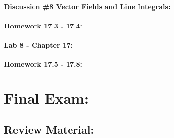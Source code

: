 \documentclass[9pt]{amsart}
\begin{document}
        \paragraph{Discussion \#8 Vector Fields and Line Integrals:}
            

        \paragraph{Homework 17.3 - 17.4:}
            
        \newpage
        \paragraph{Lab 8 - Chapter 17:}
            

        \paragraph{Homework 17.5 - 17.8:}
            

\section{Final Exam:}
    \subsection{Review Material:}
\end{document}
